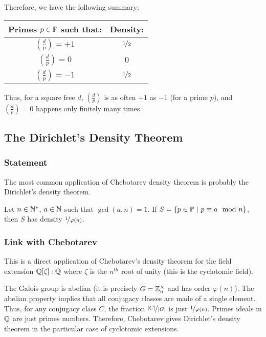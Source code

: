 Therefore, we have the following summary:
\begin{center}
	\begin{tabular}{|c|c|}
		\hline
		Primes $p \in \mathbb{P}$ such that: & Density:\\
		\hline
		$\left( \frac{d}{p} \right) = +1$ & $\nicefrac{1}{2}$\\
		$\left( \frac{d}{p} \right) =  0$ & $0$\\
		$\left( \frac{d}{p} \right) = -1$ & $\nicefrac{1}{2}$\\
		\hline
	\end{tabular}
\end{center}
Thus, for a square free $d$, $\left( \frac{d}{p} \right)$ is as often $+1$ as $-1$ (for a prime $p$), and  $\left( \frac{d}{p} \right) = 0$ happens only finitely many times.



\subsection{The Dirichlet's Density Theorem}
\subsubsection{Statement}
The most common application of Chebotarev density theorem is probably the Dirichlet's density theorem.
\begin{theorem}
	Let $n \in \mathbb{N}^*$, $a \in \mathbb{N}$ such that $\gcd(a,n) = 1$. 
	If $S = \{ p \in \mathbb{P} \ | \ p \equiv a \mod n \}$, then $S$ has density $\nicefrac{1}{\varphi(n)}$.
\end{theorem}

\subsubsection{Link with Chebotarev}
This is a direct application of Chebotarev's density theorem for the field extension $\mathbb{Q}[\zeta]:\mathbb{Q}$ where $\zeta$ is the $n^{th}$ root of unity (this is the cyclotomic field).

The Galois group is abelian (it is precisely $G=\mathbb{Z}_n^{\times}$ and has order $\varphi(n)$).
The abelian property implies that all conjugacy classes are made of a single element.
Thus, for any conjugacy class $C$, the fraction $\nicefrac{|C|}{|G|}$ is just $\nicefrac{1}{\varphi(n)}$.
Primes ideals in $\mathbb{Q}$ are just primes numbers.
Therefore, Chebotarev gives Dirichlet's density theorem in the particular case of cyclotomic extensions.

